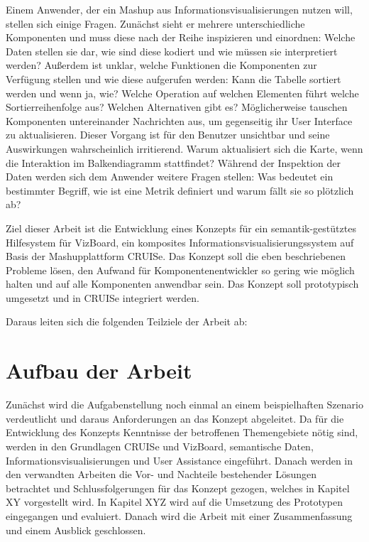 \documentclass[
	headsepline,
	footsepline,
	fontsize=12pt,
	bibliography=totoc
]{scrbook}
\begin{document}
Einem Anwender, der ein Mashup aus Informationsvisualisierungen nutzen will, stellen sich einige Fragen. Zunächst sieht er mehrere unterschiedliche Komponenten und muss diese nach der Reihe inspizieren und einordnen: Welche Daten stellen sie dar, wie sind diese kodiert und wie müssen sie interpretiert werden? Außerdem ist unklar, welche Funktionen die Komponenten zur Verfügung stellen und wie diese aufgerufen werden: Kann die Tabelle sortiert werden und wenn ja, wie? Welche Operation auf welchen Elementen führt welche Sortierreihenfolge aus? Welchen Alternativen gibt es? Möglicherweise tauschen Komponenten untereinander Nachrichten aus, um gegenseitig ihr User Interface zu aktualisieren. Dieser Vorgang ist für den Benutzer unsichtbar und seine Auswirkungen wahrscheinlich irritierend. Warum aktualisiert sich die Karte, wenn die Interaktion im Balkendiagramm stattfindet? Während der Inspektion der Daten werden sich dem Anwender weitere Fragen stellen: Was bedeutet ein bestimmter Begriff, wie ist eine Metrik definiert und warum fällt sie so plötzlich ab?


Ziel dieser Arbeit ist die Entwicklung eines Konzepts für ein semantik-gestütztes Hilfesystem für VizBoard, ein komposites Informationsvisualisierungssystem auf Basis der Mashupplattform CRUISe. Das Konzept soll die eben beschriebenen Probleme lösen, den Aufwand für Komponentenentwickler so gering wie möglich halten und auf alle Komponenten anwendbar sein. Das Konzept soll prototypisch umgesetzt und in CRUISe integriert werden.

Daraus leiten sich die folgenden Teilziele der Arbeit ab: %


\section{Aufbau der Arbeit}
\label{section:einleitung:aufbau}

Zunächst wird die Aufgabenstellung noch einmal an einem beispielhaften Szenario verdeutlicht und daraus Anforderungen an das Konzept abgeleitet. Da für die Entwicklung des Konzepts Kenntnisse der betroffenen Themengebiete nötig sind, werden in den Grundlagen CRUISe und VizBoard, semantische Daten, Informationsvisualisierungen und User Assistance eingeführt. Danach werden in den verwandten Arbeiten die Vor- und Nachteile bestehender Lösungen betrachtet und Schlussfolgerungen für das Konzept gezogen, welches in Kapitel XY vorgestellt wird. In Kapitel XYZ wird auf die Umsetzung des Prototypen eingegangen und evaluiert. Danach wird die Arbeit mit einer Zusammenfassung und einem Ausblick geschlossen.
\end{document}
